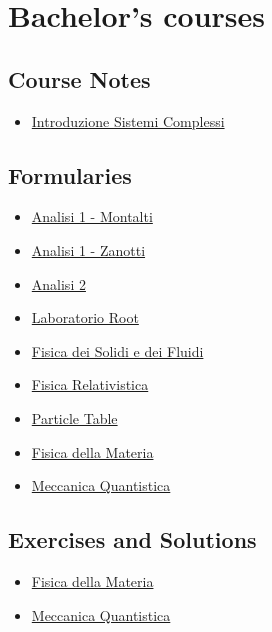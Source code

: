 \documentclass{article}
\begin{document}
\section{Bachelor's courses}

\subsection{Course Notes}

    \begin{itemize}
        \item \href{source/b_introduzione_sistemi_complessi.html}{Introduzione Sistemi Complessi}
    \end{itemize}

\subsection{Formularies}

    \begin{itemize}
        \item \href{source/b_formulario_analisi_1_mon.html}{Analisi 1 - Montalti}
        \item \href{source/b_formulario_analisi_1_zan.html}{Analisi 1 - Zanotti}
        \item \href{source/b_formulario_analisi_2.html}{Analisi 2}
        \item \href{source/b_formulario_laboratorio_root.html}{Laboratorio Root}
        \item \href{source/b_formulario_fisica_dei_solidi_e_dei_fluidi.html}{Fisica dei Solidi e dei Fluidi}
        \item \href{source/b_formulario_fisica_relativistica.html}{Fisica Relativistica}
        \item \href{source/b_formulario_particle_table.html}{Particle Table}
        \item \href{source/b_formulario_materia.html}{Fisica della Materia}
        \item \href{source/b_formulario_meccanica_quantistica.html}{Meccanica Quantistica}
    \end{itemize}

\subsection{Exercises and Solutions}

    \begin{itemize}
        \item \href{source/b_exercises_soluzioni_materia.html}{Fisica della Materia}
        \item \href{source/b_exercises_soluzioni_meccanica_quantistica.html}{Meccanica Quantistica}
    \end{itemize}
\end{document}
